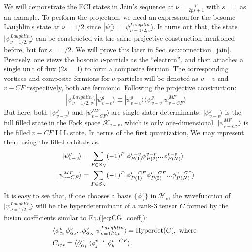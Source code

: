 We will demonstrate the FCI states in Jain's sequence at $\nu=\frac{p}{2ps+1}$ with $s=1$ as an example. To perform the projection, we need an expression for the bosonic Laughlin's state at $\nu=1/2$ since $|\psi^g_v\rangle=|\psi^{Laughlin}_{\nu=1/2,v}\rangle$. It turns out that, the state $|\psi^{Laughlin}_{\nu=1/2,v}\rangle$ can be constructed via the same projective construction mentioned before, but for $s=1/2$. We will prove this later in Sec.\ref{sec:connection_jain}. Precisely, one views the bosonic $v$-particle as the ``electron'', and then attaches a single unit of flux ($2s=1$) to form a composite fermion. The corresponding vortices and composite fermions for $v$-particles will be denoted as $v-v$ and $v-CF$ respectively, both are fermionic. Following the projective construction:
\begin{align}
|\psi^{Laughlin}_{\nu=1/2,v}\rangle | \psi^g_{v-v}\rangle \equiv|\psi^g_{v-v}\rangle\langle \psi^g_{v-v}|\psi^{MF}_{v-CF}\rangle
\end{align}
But here, both $|\psi^g_{v-v}\rangle$ and $|\psi^{MF}_{v-CF}\rangle$ are single slater determinants: $|\psi^g_{v-v}\rangle$ is the full filled state in the Fock space $\mathcal K_{v-v}$, which is only one-dimensional. $|\psi^{MF}_{v-CF}\rangle$ is the filled $v-CF$ LLL state. In terms of the first quantization, We may represent them using the filled orbitals as:
\begin{align}
|\psi^g_{v-v}\rangle&=\sum_{P\in S_N} (-1)^P |\phi^{v-v}_{P(1)}\phi^{v-v}_{P(2)}...\phi^{v-v}_{P(N)}\rangle\notag\\
|\psi^{MF}_{v-CF}\rangle&=\sum_{P\in S_N} (-1)^P |\phi^{v-CF}_{P(1)}\phi^{v-CF}_{P(2)}...\phi^{v-CF}_{P(N)}\rangle\notag\\
\end{align}
It is easy to see that, if one chooses a basis $\{\phi^v_{\alpha}\}$ in $\mathcal H_v$, the wavefunction of $|\psi^{Laughlin}_{\nu=1/2,v}\rangle$ will be the hyperdeterminant of a rank-3 tensor $C$ formed by the fusion coefficients similar to Eq.(\ref{eq:CG_coeff}):
\begin{align}
&\langle \phi^v_{\alpha_1}\phi^v_{\alpha_2}...\phi^v_{\alpha_N}|\psi^{Laughlin}_{\nu=1/2,v}\rangle=\text{Hyperdet}(C), \text { where }\notag\\
& C_{ijk}=\langle \phi^v_{\alpha_i}|\langle \phi^{v-v}_{j}|\phi^{v-CF}_{k}\rangle.
\end{align}

